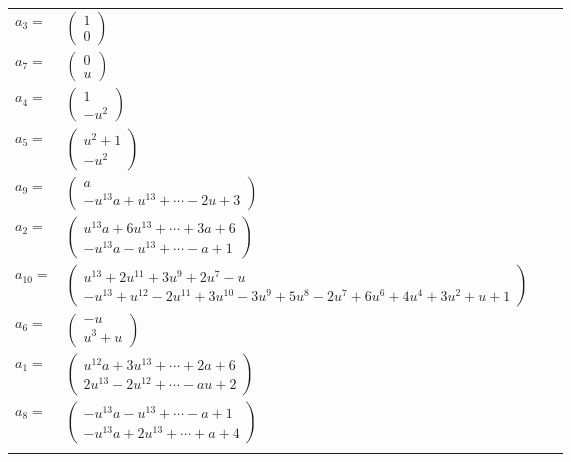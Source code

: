 \documentclass[1p]{elsarticle_modified}
\theoremstyle{definition}
\begin{document}
\begin{tabular}{m{7pt} m{180pt} m{7pt} m{180pt} }
\flushright $a_{3}=$&$\begin{pmatrix}1\\0\end{pmatrix}$ \\
\flushright $a_{7}=$&$\begin{pmatrix}0\\u\end{pmatrix}$ \\
\flushright $a_{4}=$&$\begin{pmatrix}1\\- u^2\end{pmatrix}$ \\
\flushright $a_{5}=$&$\begin{pmatrix}u^2+1\\- u^2\end{pmatrix}$ \\
\flushright $a_{9}=$&$\begin{pmatrix}a\\- u^{13} a+u^{13}+\cdots-2 u+3\end{pmatrix}$ \\
\flushright $a_{2}=$&$\begin{pmatrix}u^{13} a+6 u^{13}+\cdots+3 a+6\\- u^{13} a- u^{13}+\cdots- a+1\end{pmatrix}$ \\
\flushright $a_{10}=$&$\begin{pmatrix}u^{13}+2 u^{11}+3 u^9+2 u^7- u\\- u^{13}+u^{12}-2 u^{11}+3 u^{10}-3 u^9+5 u^8-2 u^7+6 u^6+4 u^4+3 u^2+u+1\end{pmatrix}$ \\
\flushright $a_{6}=$&$\begin{pmatrix}- u\\u^3+u\end{pmatrix}$ \\
\flushright $a_{1}=$&$\begin{pmatrix}u^{12} a+3 u^{13}+\cdots+2 a+6\\2 u^{13}-2 u^{12}+\cdots- a u+2\end{pmatrix}$ \\
\flushright $a_{8}=$&$\begin{pmatrix}- u^{13} a- u^{13}+\cdots- a+1\\- u^{13} a+2 u^{13}+\cdots+a+4\end{pmatrix}$\\&\end{tabular}
\end{document}
